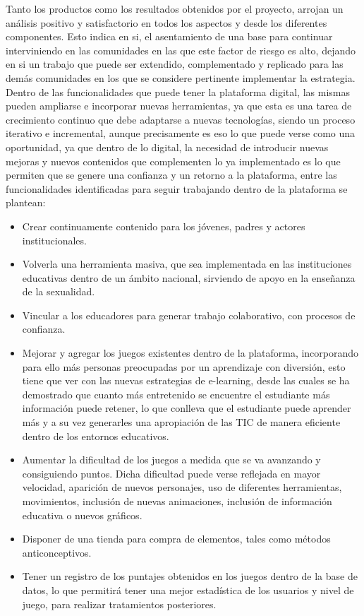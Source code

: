 \documentclass[a4paper]{article}
\begin{document}
Tanto los productos como los resultados obtenidos por el proyecto, arrojan un análisis positivo y satisfactorio en todos los aspectos y desde los diferentes componentes. Esto indica en si, el asentamiento de una base para continuar interviniendo en las comunidades en las que este factor de riesgo es alto, dejando en si un trabajo que puede ser extendido, complementado y replicado para las demás comunidades en los que se considere pertinente implementar la estrategia. Dentro de las funcionalidades que puede tener la plataforma digital, las mismas pueden ampliarse e incorporar nuevas herramientas, ya que esta es una tarea de crecimiento continuo que debe adaptarse a nuevas tecnologías, siendo un proceso iterativo e incremental, aunque precisamente es eso lo que puede verse como una oportunidad, ya que dentro de lo digital, la necesidad de introducir nuevas mejoras y nuevos contenidos que complementen lo ya implementado es lo que permiten que se genere una confianza y un retorno a la plataforma, entre las funcionalidades identificadas para seguir trabajando dentro de la plataforma se plantean:

\begin{itemize}
\item Crear continuamente contenido para los jóvenes, padres y actores institucionales.
\item Volverla una herramienta masiva, que sea implementada en las instituciones educativas dentro de un ámbito nacional, sirviendo de apoyo en la enseñanza de la sexualidad.
\item Vincular a los educadores para generar trabajo colaborativo, con procesos de confianza.
\item Mejorar y agregar los juegos existentes dentro de la plataforma, incorporando para ello más personas preocupadas por un aprendizaje con diversión, esto tiene que ver con las nuevas estrategias de e-learning, desde las cuales se ha demostrado que cuanto más entretenido se encuentre el estudiante más información puede retener, lo que conlleva que el estudiante puede aprender más y a su vez generarles una apropiación de las TIC de manera eficiente dentro de los entornos educativos.
\item Aumentar la dificultad de los juegos a medida que se va avanzando y consiguiendo puntos. Dicha dificultad puede verse reflejada en mayor velocidad, aparición de nuevos personajes, uso de diferentes herramientas, movimientos, inclusión de nuevas animaciones, inclusión de información educativa o nuevos gráficos.
\item Disponer de una tienda para compra de elementos, tales como métodos anticonceptivos.
\item Tener un registro de los puntajes obtenidos en los juegos dentro de la base de datos, lo que permitirá tener una mejor estadística de los usuarios y nivel de juego, para realizar tratamientos posteriores.
\end{itemize}

\clearpage


\end{document}
